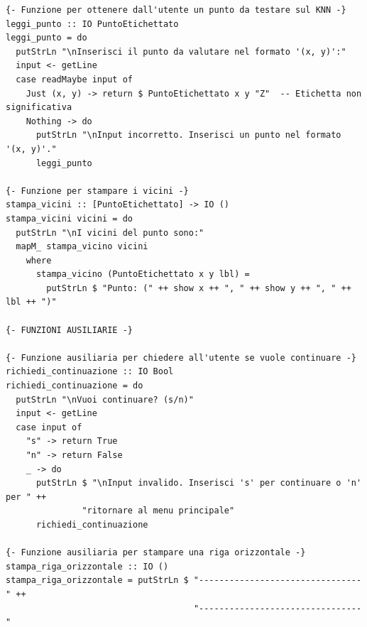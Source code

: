 \documentclass[11pt]{article}
\theoremstyle{definition}
\begin{document}
\begin{verbatim}
{- Funzione per ottenere dall'utente un punto da testare sul KNN -}
leggi_punto :: IO PuntoEtichettato
leggi_punto = do
  putStrLn "\nInserisci il punto da valutare nel formato '(x, y)':"
  input <- getLine
  case readMaybe input of
    Just (x, y) -> return $ PuntoEtichettato x y "Z"  -- Etichetta non significativa
    Nothing -> do
      putStrLn "\nInput incorretto. Inserisci un punto nel formato '(x, y)'."
      leggi_punto

{- Funzione per stampare i vicini -}
stampa_vicini :: [PuntoEtichettato] -> IO ()
stampa_vicini vicini = do
  putStrLn "\nI vicini del punto sono:"
  mapM_ stampa_vicino vicini
    where
      stampa_vicino (PuntoEtichettato x y lbl) =
        putStrLn $ "Punto: (" ++ show x ++ ", " ++ show y ++ ", " ++ lbl ++ ")"

{- FUNZIONI AUSILIARIE -}

{- Funzione ausiliaria per chiedere all'utente se vuole continuare -}
richiedi_continuazione :: IO Bool
richiedi_continuazione = do
  putStrLn "\nVuoi continuare? (s/n)"
  input <- getLine
  case input of
    "s" -> return True
    "n" -> return False
    _ -> do
      putStrLn $ "\nInput invalido. Inserisci 's' per continuare o 'n' per " ++ 
               "ritornare al menu principale"
      richiedi_continuazione

{- Funzione ausiliaria per stampare una riga orizzontale -}
stampa_riga_orizzontale :: IO ()
stampa_riga_orizzontale = putStrLn $ "--------------------------------" ++ 
                                     "--------------------------------"

\end{verbatim}

\newpage
\end{document}
